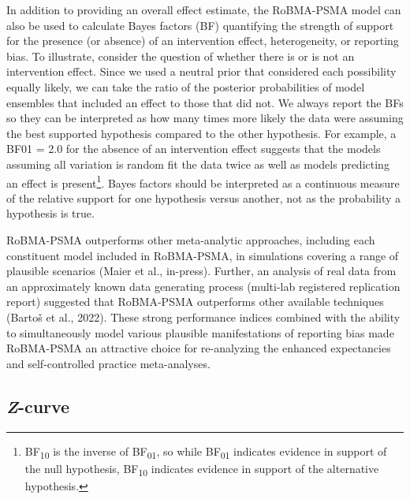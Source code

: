 \documentclass[
  man, donotrepeattitle,floatsintext]{apa7}
\begin{document}
In addition to providing an overall effect estimate, the RoBMA-PSMA model can also be used to calculate Bayes factors (BF) quantifying the strength of support for the presence (or absence) of an intervention effect, heterogeneity, or reporting bias. To illustrate, consider the question of whether there is or is not an intervention effect. Since we used a neutral prior that considered each possibility equally likely, we can take the ratio of the posterior probabilities of model ensembles that included an effect to those that did not. We always report the BFs so they can be interpreted as how many times more likely the data were assuming the best supported hypothesis compared to the other hypothesis. For example, a BF01 = 2.0 for the absence of an intervention effect suggests that the models assuming all variation is random fit the data twice as well as models predicting an effect is present\footnote{BF\textsubscript{10} is the inverse of BF\textsubscript{01}, so while BF\textsubscript{01} indicates evidence in support of the null hypothesis, BF\textsubscript{10} indicates evidence in support of the alternative hypothesis.}. Bayes factors should be interpreted as a continuous measure of the relative support for one hypothesis versus another, not as the probability a hypothesis is true.

RoBMA-PSMA outperforms other meta-analytic approaches, including each constituent model included in RoBMA-PSMA, in simulations covering a range of plausible scenarios (Maier et al., in-press). Further, an analysis of real data from an approximately known data generating process (multi-lab registered replication report) suggested that RoBMA-PSMA outperforms other available techniques (Bartoš et al., 2022). These strong performance indices combined with the ability to simultaneously model various plausible manifestations of reporting bias made RoBMA-PSMA an attractive choice for re-analyzing the enhanced expectancies and self-controlled practice meta-analyses.

\hypertarget{z-curve}{%
\subsection{\texorpdfstring{\emph{Z}-curve}{Z-curve}}\label{z-curve}}
\end{document}
